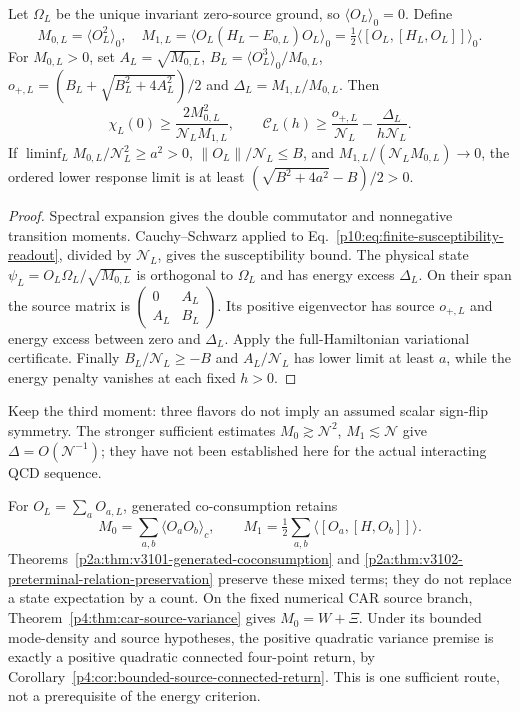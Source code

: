 \documentclass[12pt,a4paper]{article}
\begin{document}
\begin{theorem}
\label{p10:thm:chiral-source-moment-certificate}
Let $\Omega_L$ be the unique invariant zero-source ground, so
$\langle O_L\rangle_0=0$. Define
\[
 M_{0,L}=\langle O_L^2\rangle_0,\quad
 M_{1,L}=\langle O_L(H_L-E_{0,L})O_L\rangle_0
       =\tfrac12\langle[O_L,[H_L,O_L]]\rangle_0.
\]
For $M_{0,L}>0$, set
$A_L=\sqrt{M_{0,L}}$, $B_L=\langle O_L^3\rangle_0/M_{0,L}$,
$o_{+,L}=(B_L+\sqrt{B_L^2+4A_L^2})/2$ and
$\Delta_L=M_{1,L}/M_{0,L}$. Then
\[
 \chi_L(0)\ge\frac{2M_{0,L}^2}{\mathcal N_LM_{1,L}},\qquad
 \mathcal C_L(h)\ge\frac{o_{+,L}}{\mathcal N_L}
                 -\frac{\Delta_L}{h\mathcal N_L}.
\]
If $\liminf_LM_{0,L}/\mathcal N_L^2\ge a^2>0$,
$\|O_L\|/\mathcal N_L\le B$, and
$M_{1,L}/(\mathcal N_LM_{0,L})\to0$, the ordered lower response
limit is at least $(\sqrt{B^2+4a^2}-B)/2>0$.
\end{theorem}
\begin{proof}
Spectral expansion gives the double commutator and nonnegative
transition moments. Cauchy--Schwarz applied to
Eq.~\eqref{p10:eq:finite-susceptibility-readout}, divided by
$\mathcal N_L$, gives the susceptibility bound. The physical state
$\psi_L=O_L\Omega_L/\sqrt{M_{0,L}}$ is orthogonal to $\Omega_L$
and has energy excess $\Delta_L$. On their span the source matrix is
$\left(\begin{smallmatrix}0&A_L\\A_L&B_L\end{smallmatrix}\right)$.
Its positive eigenvector has source $o_{+,L}$ and energy excess
between zero and $\Delta_L$. Apply the full-Hamiltonian variational
certificate. Finally $B_L/\mathcal N_L\ge-B$ and
$A_L/\mathcal N_L$ has lower limit at least $a$, while the energy
penalty vanishes at each fixed $h>0$.
\end{proof}
Keep the third moment: three flavors do not imply an assumed scalar
sign-flip symmetry. The stronger sufficient estimates
$M_0\gtrsim\mathcal N^2$, $M_1\lesssim\mathcal N$ give
$\Delta=O(\mathcal N^{-1})$; they have not been established here for
the actual interacting QCD sequence.

For $O_L=\sum_aO_{a,L}$, generated co-consumption retains
\[
 M_0=\sum_{a,b}\langle O_aO_b\rangle_c,\qquad
 M_1=\tfrac12\sum_{a,b}\langle[O_a,[H,O_b]]\rangle.
\]
Theorems~\ref{p2a:thm:v3101-generated-coconsumption} and
\ref{p2a:thm:v3102-preterminal-relation-preservation} preserve
these mixed terms; they do not replace a state expectation by a count.
On the fixed numerical CAR source branch,
Theorem~\ref{p4:thm:car-source-variance} gives $M_0=W+\Xi$.
Under its bounded mode-density and source hypotheses, the positive
quadratic variance premise is exactly a positive quadratic connected
four-point return, by Corollary~\ref{p4:cor:bounded-source-connected-return}.
This is one sufficient route, not a prerequisite of the energy criterion.
\end{document}
